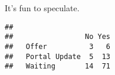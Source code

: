 \documentclass[
]{article}
\newenvironment{Shaded}{\begin{snugshade}}{\end{snugshade}}
\newcommand{\FunctionTok}[1]{\textcolor[rgb]{0.13,0.29,0.53}{\textbf{#1}}}
\newcommand{\NormalTok}[1]{#1}
\newcommand{\SpecialCharTok}[1]{\textcolor[rgb]{0.81,0.36,0.00}{\textbf{#1}}}
\begin{document}
It's fun to speculate.

\begin{Shaded}
\end{Shaded}

\begin{verbatim}
##                
##                 No Yes
##   Offer          3   6
##   Portal Update  5  13
##   Waiting       14  71
\end{verbatim}
\end{document}
